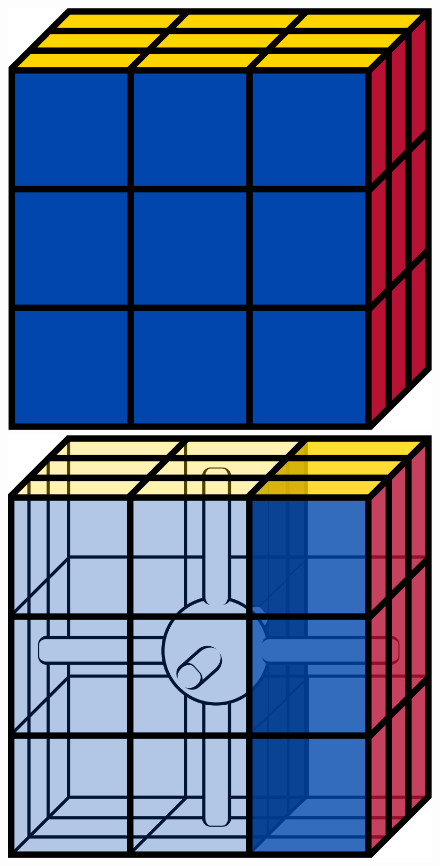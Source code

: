 \documentclass[12pt]{article}
\begin{document}
\begin{figure}[h]
    \centering
    \begin{minipage}[c]{0.2\textwidth}
        \includegraphics[scale=0.1]{cube.png}
    \end{minipage}
    \begin{minipage}[c]{0.2\textwidth}
        \includegraphics[scale=0.1]{core_r_highlight.png}

\end{minipage}
\end{figure}
\end{document}
